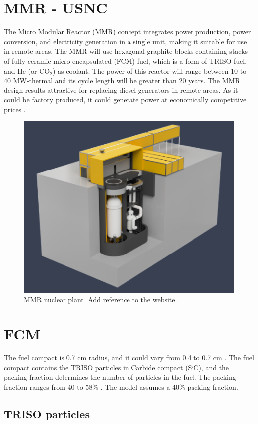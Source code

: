 \section{MMR - USNC}

The Micro Modular Reactor (MMR) concept integrates power production, power conversion, and electricity generation in a single unit, making it suitable for use in remote areas. 
The MMR will use hexagonal graphite blocks containing stacks of fully ceramic micro-encapsulated (FCM) fuel, which is a form of TRISO fuel, and He (or CO$_2$) as coolant.
The power of this reactor will range between 10 to 40 MW-thermal and its cycle length will be greater than 20 years.
The MMR design results attractive for replacing diesel generators in remote areas. As it could be factory produced, it could generate power at economically competitive prices \cite{hawari_development_2018}.

\begin{figure}[H]
	\centering
	\includegraphics[width=0.5\linewidth]{figures/mmr.png}
	\hfill
	\caption{MMR nuclear plant [Add reference to the website].}
	\label{fig:triso}
\end{figure}

\section{FCM}

The fuel compact is 0.7 cm radius, and it could vary from 0.4 to 0.7 cm \cite{powers_fully_2013}. The fuel compact contains the TRISO particles in Carbide compact (SiC), and the packing fraction determines the number of particles in the fuel. The packing fraction ranges from 40 to 58\% \cite{powers_fully_2013}. The model assumes a 40\% packing fraction.

\subsection{TRISO particles}

